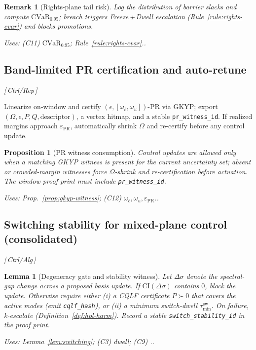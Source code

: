 \documentclass[10pt]{article}
\makeatletter
\newcommand{\uses}[1]{\par\smallskip\noindent\textit{Uses: }#1.\par\smallskip}
\newcommand{\layertag}[1]{\textsf{\footnotesize[\,#1\,]}}
\newcommand{\constref}[1]{%
  \@ifundefined{constsym#1}{\textbf{[C-#1 ??]}}{\csname constsym#1\endcsname}}
\providecommand{\constsymPRmargin}{\varepsilon_{\mathrm{PR}}}
\providecommand{\constsymomegal}{\omega_{\ell}}
\providecommand{\constsymomegau}{\omega_{u}}
\newtheorem{lemma}{Lemma}
\newtheorem{proposition}{Proposition}
\newtheorem{remark}{Remark}
\makeatother
\begin{document}
\begin{remark}[Rights-plane tail risk]\label{rem:cvar}
Log the distribution of barrier slacks and compute $\mathrm{CVaR}_{0.95}$; breach triggers Freeze\,+\,Dwell escalation (Rule~\ref{rule:rights-cvar}) and blocks promotions.
\uses{(C11) $\mathrm{CVaR}_{0.95}$; Rule~\ref{rule:rights-cvar}.}
\end{remark}

\subsection{Band-limited PR certification and auto-retune}\label{subsec:pr-cert}
\emph{\layertag{Ctrl/Rep}}

Linearize on-window and certify $(\epsilon,[\constsymomegal,\constsymomegau])$-PR via GKYP; export $(\Omega,\epsilon,P,Q,\text{descriptor})$, a vertex hitmap, and a stable \texttt{pr\_witness\_id}. If realized margins approach $\constsymPRmargin$, automatically shrink $\Omega$ and re-certify before any control update.

\begin{proposition}[PR witness consumption]\label{prop:pr-consume}
Control updates are allowed only when a matching GKYP witness is present for the current uncertainty set; absent or crowded-margin witnesses force $\Omega$-shrink and re-certification \emph{before} actuation. The window proof print must include \texttt{pr\_witness\_id}.
\uses{Prop.~\ref{prop:gkyp-witness}; (C12) $\constsymomegal,\constsymomegau,\constsymPRmargin$.}
\end{proposition}

\subsection{Switching stability for mixed-plane control (consolidated)}\label{subsec:switch}
\emph{\layertag{Ctrl/Alg}}

\begin{lemma}[Degeneracy gate and stability witness]\label{lem:deg-stab}
Let $\Delta\sigma$ denote the spectral-gap change across a proposed basis update. If $\mathrm{CI}(\Delta\sigma)$ contains $0$, block the update. Otherwise require either (i) a CQLF certificate $P\succ 0$ that covers the active modes (emit \texttt{cqlf\_hash}), or (ii) a minimum switch-dwell $\tau_{\min}^{\mathrm{sw}}$. On failure, \emph{k}-escalate (Definition~\ref{def:hol-harm}). Record a stable \texttt{switch\_stability\_id} in the proof print.
\uses{Lemma~\ref{lem:switching}; (C3) dwell; (C9) \constref{Harm}.}
\end{lemma}
\end{document}
